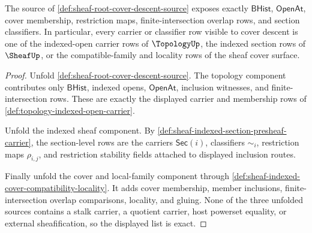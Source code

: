 \begin{theorem}
\label{thm:sheaf-root-cover-descent-carrier-exactness}
The source of \autoref{def:sheaf-root-cover-descent-source} exposes exactly $\mathsf{BHist}$, $\mathsf{OpenAt}$, cover membership, restriction maps, finite-intersection overlap rows, and section classifiers. In particular, every carrier or classifier row visible to cover descent is one of the indexed-open carrier rows of $\TopologyUp$, the indexed section rows of $\SheafUp$, or the compatible-family and locality rows of the sheaf cover surface.
\end{theorem}
\begin{proof}
Unfold \autoref{def:sheaf-root-cover-descent-source}. The topology component contributes only $\mathsf{BHist}$, indexed opens, $\mathsf{OpenAt}$, inclusion witnesses, and finite-intersection rows. These are exactly the displayed carrier and membership rows of \autoref{def:topology-indexed-open-carrier}.

Unfold the indexed sheaf component. By \autoref{def:sheaf-indexed-section-presheaf-carrier}, the section-level rows are the carriers $\mathsf{Sec}(i)$, classifiers $\sim_i$, restriction maps $\rho_{i,j}$, and restriction stability fields attached to displayed inclusion routes.

Finally unfold the cover and local-family component through \autoref{def:sheaf-indexed-cover-compatibility-locality}. It adds cover membership, member inclusions, finite-intersection overlap comparisons, locality, and gluing. None of the three unfolded sources contains a stalk carrier, a quotient carrier, host powerset equality, or external sheafification, so the displayed list is exact.
\end{proof}

